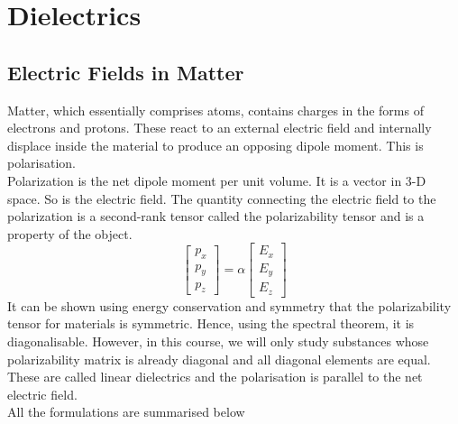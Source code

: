 \documentclass[12pt, oneside]{book}
\begin{document}
\chapter{Dielectrics}
\section{Electric Fields in Matter}
Matter, which essentially comprises atoms, contains charges in the forms of electrons and protons. These react to an external electric field and internally displace inside the material to produce an opposing dipole moment. This is polarisation. \\
Polarization is the net dipole moment per unit volume. It is a vector in 3-D space. So is the electric field. The quantity connecting the electric field to the polarization is a second-rank tensor called the polarizability tensor and is a property of the object.
\begin{equation}
    \begin{bmatrix}
        p_x\\
        p_y\\
        p_z 
    \end{bmatrix}
     = \alpha
     \begin{bmatrix}
        E_x\\
        E_y\\
        E_z
     \end{bmatrix}
\end{equation}
It can be shown using energy conservation and symmetry that the polarizability tensor for materials is symmetric. Hence, using the spectral theorem, it is diagonalisable. However, in this course, we will only study substances whose polarizability matrix is already diagonal and all diagonal elements are equal. These are called linear dielectrics and the polarisation is parallel to the net electric field. \\

All the formulations are summarised below
\end{document}
